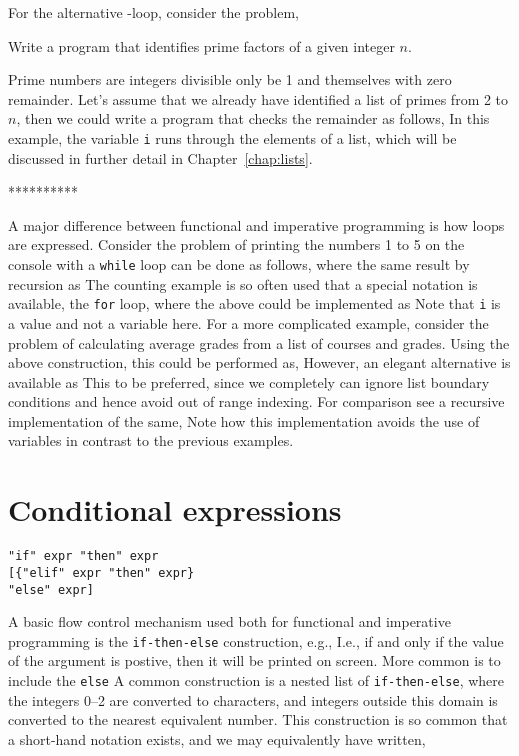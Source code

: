 For the alternative -loop, consider the problem,
\begin{problem}
  Write a program that identifies prime factors of a given integer $n$.
\end{problem}
Prime numbers are integers divisible only be 1 and themselves with zero remainder. Let's assume that we already have identified a list of primes from 2 to $n$, then we could write a program that checks the remainder as follows,
%
%
In this example, the variable \lstinline!i! runs through the elements of a list, which will be discussed in further detail in Chapter~\ref{chap:lists}.

**********


A major difference between functional and imperative programming is how loops are expressed. Consider the problem of printing the numbers 1 to 5 on the console with a \texttt{while} loop can be done as follows,
where the same result by recursion as
The counting example is so often used that a special notation is available, the \texttt{for} loop, where the above could be implemented as
Note that \texttt{i} is a value and not a variable here. For a more complicated example, consider the problem of calculating average grades from a list of courses and grades. Using the above construction, this could be performed as,
However, an elegant alternative is available as
This to be preferred, since we completely can ignore list boundary conditions and hence avoid out of range indexing. For comparison see a recursive implementation of the same,
Note how this implementation avoids the use of variables in contrast to the previous examples.

\section{Conditional expressions}
\begin{lstlisting}[language=ebnf]
"if" expr "then" expr 
[{"elif" expr "then" expr}
"else" expr]
\end{lstlisting}
A basic flow control mechanism used both for functional and imperative programming is the \texttt{if-then-else} construction, e.g.,
I.e., if and only if the value of the argument is postive, then it will be printed on screen. More common is to include the \texttt{else} 
A common construction is a nested list of \texttt{if-then-else},
where the integers 0--2 are converted to characters, and integers outside this domain is converted to the nearest equivalent number. This construction is so common that a short-hand notation exists, and we may equivalently have written,

